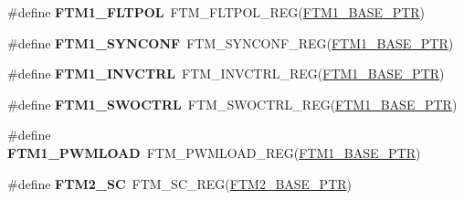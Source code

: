 \begin{DoxyCompactItemize}
\item 
\hypertarget{group___f_t_m___register___accessor___macros_ga32e8c762a4052df13b0a83d193a3e7b4}{}\#define {\bfseries F\+T\+M1\+\_\+\+F\+L\+T\+P\+O\+L}~F\+T\+M\+\_\+\+F\+L\+T\+P\+O\+L\+\_\+\+R\+E\+G(\hyperlink{group___f_t_m___peripheral_ga38115fba8eadfc94b2fc411f45906002}{F\+T\+M1\+\_\+\+B\+A\+S\+E\+\_\+\+P\+T\+R})\label{group___f_t_m___register___accessor___macros_ga32e8c762a4052df13b0a83d193a3e7b4}

\item 
\hypertarget{group___f_t_m___register___accessor___macros_ga35e57dca64050e3bf21ebd3367422d8f}{}\#define {\bfseries F\+T\+M1\+\_\+\+S\+Y\+N\+C\+O\+N\+F}~F\+T\+M\+\_\+\+S\+Y\+N\+C\+O\+N\+F\+\_\+\+R\+E\+G(\hyperlink{group___f_t_m___peripheral_ga38115fba8eadfc94b2fc411f45906002}{F\+T\+M1\+\_\+\+B\+A\+S\+E\+\_\+\+P\+T\+R})\label{group___f_t_m___register___accessor___macros_ga35e57dca64050e3bf21ebd3367422d8f}

\item 
\hypertarget{group___f_t_m___register___accessor___macros_gae73f881f4506af2ab7ce231c4c4f0089}{}\#define {\bfseries F\+T\+M1\+\_\+\+I\+N\+V\+C\+T\+R\+L}~F\+T\+M\+\_\+\+I\+N\+V\+C\+T\+R\+L\+\_\+\+R\+E\+G(\hyperlink{group___f_t_m___peripheral_ga38115fba8eadfc94b2fc411f45906002}{F\+T\+M1\+\_\+\+B\+A\+S\+E\+\_\+\+P\+T\+R})\label{group___f_t_m___register___accessor___macros_gae73f881f4506af2ab7ce231c4c4f0089}

\item 
\hypertarget{group___f_t_m___register___accessor___macros_ga08a648587eb98aa8f510bcac93cb4b33}{}\#define {\bfseries F\+T\+M1\+\_\+\+S\+W\+O\+C\+T\+R\+L}~F\+T\+M\+\_\+\+S\+W\+O\+C\+T\+R\+L\+\_\+\+R\+E\+G(\hyperlink{group___f_t_m___peripheral_ga38115fba8eadfc94b2fc411f45906002}{F\+T\+M1\+\_\+\+B\+A\+S\+E\+\_\+\+P\+T\+R})\label{group___f_t_m___register___accessor___macros_ga08a648587eb98aa8f510bcac93cb4b33}

\item 
\hypertarget{group___f_t_m___register___accessor___macros_gaf3039ddac66aabede5d916fcbf685041}{}\#define {\bfseries F\+T\+M1\+\_\+\+P\+W\+M\+L\+O\+A\+D}~F\+T\+M\+\_\+\+P\+W\+M\+L\+O\+A\+D\+\_\+\+R\+E\+G(\hyperlink{group___f_t_m___peripheral_ga38115fba8eadfc94b2fc411f45906002}{F\+T\+M1\+\_\+\+B\+A\+S\+E\+\_\+\+P\+T\+R})\label{group___f_t_m___register___accessor___macros_gaf3039ddac66aabede5d916fcbf685041}

\item 
\hypertarget{group___f_t_m___register___accessor___macros_ga07c259e6bd81732e7c252d9bea24c4b8}{}\#define {\bfseries F\+T\+M2\+\_\+\+S\+C}~F\+T\+M\+\_\+\+S\+C\+\_\+\+R\+E\+G(\hyperlink{group___f_t_m___peripheral_ga897564efeaf1be1f991305d294eda3d6}{F\+T\+M2\+\_\+\+B\+A\+S\+E\+\_\+\+P\+T\+R})\label{group___f_t_m___register___accessor___macros_ga07c259e6bd81732e7c252d9bea24c4b8}


\end{DoxyCompactItemize}
